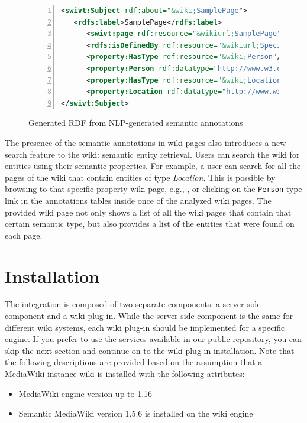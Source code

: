 \begin{figure}[h!]
\centering
\begin{lstlisting}[language=XML,numbers=left,xleftmargin=4mm,columns=flexible]
<swivt:Subject rdf:about="&wiki;SamplePage">
   <rdfs:label>SamplePage</rdfs:label>
      <swivt:page rdf:resource="&wikiurl;SamplePage"/>
      <rdfs:isDefinedBy rdf:resource="&wikiurl;Special:ExportRDF/SamplePage"/>
      <property:HasType rdf:resource="&wiki;Person"/>
      <property:Person rdf:datatype="http://www.w3.org/2001/XMLSchema#string">Mary</property:Person>
      <property:HasType rdf:resource="&wiki;Location"/>
      <property:Location rdf:datatype="http://www.w3.org/2001/XMLSchema#string">Canada</property:Location>
</swivt:Subject>
\end{lstlisting}
\caption{Generated RDF from NLP-generated semantic annotations}
\label{list:smw_rdf}
\end{figure}

The presence of the semantic annotations in wiki pages also introduces a new search feature to the wiki: semantic entity retrieval. Users can search the wiki for entities using their semantic properties. For example, a user can search for all the pages of the wiki that contain entities of type \emph{Location}. This is possible by browsing to that specific property wiki page, e.g., , or clicking on the \texttt{Person} type link in the annotations tables inside once of the analyzed wiki pages. The provided wiki page not only shows a list of all the wiki pages that contain that certain semantic type, but also provides a list of the entities that were found on each page.

\section{Installation}
The \wikinlp integration is composed of two separate components: a server-side component and a wiki plug-in. While the server-side component is the same for different wiki systems, each wiki plug-in should be implemented for a specific engine. If you prefer to use the services available in our public repository, you can skip the next section and continue on to the wiki plug-in installation. Note that the following descriptions are provided based on the assumption that a MediaWiki instance wiki is installed with the following attributes:

\begin{itemize}
\item MediaWiki engine version up to 1.16
\item Semantic MediaWiki version 1.5.6 is installed on the wiki engine
\end{itemize}


